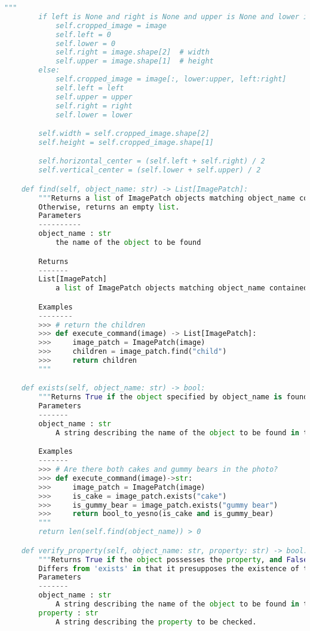 \documentclass[10pt,twocolumn,letterpaper]{article}
\begin{document}
\begin{lstlisting}[language=Python, xleftmargin=.0\textwidth, xrightmargin=.0\textwidth, caption=\textbf{Full API.}, label={listing}]
        """
        if left is None and right is None and upper is None and lower is None:
            self.cropped_image = image
            self.left = 0
            self.lower = 0
            self.right = image.shape[2]  # width
            self.upper = image.shape[1]  # height
        else:
            self.cropped_image = image[:, lower:upper, left:right]
            self.left = left
            self.upper = upper
            self.right = right
            self.lower = lower

        self.width = self.cropped_image.shape[2]
        self.height = self.cropped_image.shape[1]

        self.horizontal_center = (self.left + self.right) / 2
        self.vertical_center = (self.lower + self.upper) / 2

    def find(self, object_name: str) -> List[ImagePatch]:
        """Returns a list of ImagePatch objects matching object_name contained in the crop if any are found.
        Otherwise, returns an empty list.
        Parameters
        ----------
        object_name : str
            the name of the object to be found

        Returns
        -------
        List[ImagePatch]
            a list of ImagePatch objects matching object_name contained in the crop

        Examples
        --------
        >>> # return the children
        >>> def execute_command(image) -> List[ImagePatch]:
        >>>     image_patch = ImagePatch(image)
        >>>     children = image_patch.find("child")
        >>>     return children
        """

    def exists(self, object_name: str) -> bool:
        """Returns True if the object specified by object_name is found in the image, and False otherwise.
        Parameters
        -------
        object_name : str
            A string describing the name of the object to be found in the image.

        Examples
        -------
        >>> # Are there both cakes and gummy bears in the photo?
        >>> def execute_command(image)->str:
        >>>     image_patch = ImagePatch(image)
        >>>     is_cake = image_patch.exists("cake")
        >>>     is_gummy_bear = image_patch.exists("gummy bear")
        >>>     return bool_to_yesno(is_cake and is_gummy_bear)
        """
        return len(self.find(object_name)) > 0

    def verify_property(self, object_name: str, property: str) -> bool:
        """Returns True if the object possesses the property, and False otherwise.
        Differs from 'exists' in that it presupposes the existence of the object specified by object_name, instead checking whether the object possesses the property.
        Parameters
        -------
        object_name : str
            A string describing the name of the object to be found in the image.
        property : str
            A string describing the property to be checked.


\end{lstlisting}
\end{document}
